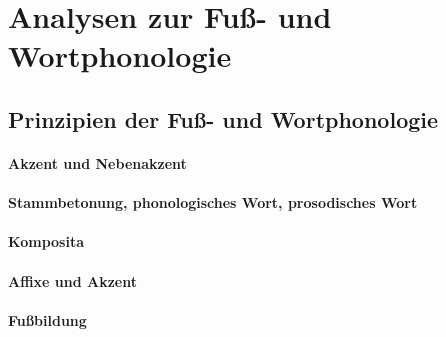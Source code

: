 \section{Analysen zur Fuß- und Wortphonologie}
\label{sec:phonologie:analysenzurfussundwortphonologie}

\subsection{Prinzipien der Fuß- und Wortphonologie}

\paragraph*{Akzent und Nebenakzent}

\paragraph*{Stammbetonung, phonologisches Wort, prosodisches Wort}

\paragraph*{Komposita}

\paragraph*{Affixe und Akzent}

\paragraph*{Fußbildung}




